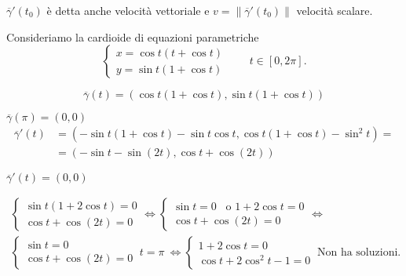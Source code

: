 \begin{definition}
		$\overline{\gamma}'(t_0)$ è detta anche velocità vettoriale e $v= \|\overline{\gamma}'(t_0)\|$ velocità scalare.
\end{definition}


\begin{exbar}
\begin{example}
	Consideriamo la cardioide di equazioni parametriche
	\begin{equation*}
		\begin{cases}
			x=\cos t(t+\cos t)\\
			y=\sin t(1+\cos t)
		\end{cases} \qquad t \in [0,2\pi].
	\end{equation*}
	
	\segnaposto %
	
	\begin{equation*}
		\overline{\gamma}(t)=(\cos t(1+\cos t),\sin t(1+\cos t))
	\end{equation*}
	
	$\overline{\gamma}(\pi)=(0,0)$
	\begin{align*} 
		\overline{\gamma}'(t)
		&=(-\sin t (1+\cos t)-\sin t\cos t, \cos t (1+\cos t)-\sin ^2t )=
		\\
		&=(-\sin t- \sin (2t),\cos t + \cos (2t))
	\end{align*}
	
	$\overline{\gamma}'(t)=(0,0)$
	
	\begin{gather*}
		\begin{cases}
			\sin t (1+2 \cos t)=0\\
			\cos t + \cos (2t)=0
		\end{cases}\Leftrightarrow
		\begin{cases}
			\sin t =0\,\,\, \text{  o  }1+2\cos t =0\\
			\cos t + \cos (2t)=0
		\end{cases}\Leftrightarrow
		\\
		\begin{cases}
			\sin t =0\\
			\cos t + \cos (2t)=0
		\end{cases} \ t=\pi\
		\Leftrightarrow
		\begin{cases}
			1+2\cos t =0\\
			\cos t +2 \cos^2 t-1=0
		\end{cases}
		\ \text{Non ha soluzioni.}
	\end{gather*}
	

\end{example}
\end{exbar}
